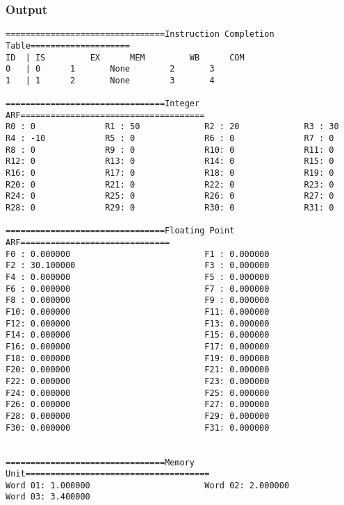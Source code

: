 \documentclass[12pt]{article}
\begin{document}
\subsubsection*{Output}
\begin{verbatim}
================================Instruction Completion Table====================
ID	| IS		 EX		 MEM		 WB		 COM
0	| 0		 1		 None		 2		 3
1	| 1		 2		 None		 3		 4

================================Integer ARF=====================================
R0 : 0              R1 : 50             R2 : 20             R3 : 30             
R4 : -10            R5 : 0              R6 : 0              R7 : 0              
R8 : 0              R9 : 0              R10: 0              R11: 0              
R12: 0              R13: 0              R14: 0              R15: 0              
R16: 0              R17: 0              R18: 0              R19: 0              
R20: 0              R21: 0              R22: 0              R23: 0              
R24: 0              R25: 0              R26: 0              R27: 0              
R28: 0              R29: 0              R30: 0              R31: 0              

================================Floating Point ARF==============================
F0 : 0.000000                           F1 : 0.000000                           
F2 : 30.100000                          F3 : 0.000000                           
F4 : 0.000000                           F5 : 0.000000                           
F6 : 0.000000                           F7 : 0.000000                           
F8 : 0.000000                           F9 : 0.000000                           
F10: 0.000000                           F11: 0.000000                           
F12: 0.000000                           F13: 0.000000                           
F14: 0.000000                           F15: 0.000000                           
F16: 0.000000                           F17: 0.000000                           
F18: 0.000000                           F19: 0.000000                           
F20: 0.000000                           F21: 0.000000                           
F22: 0.000000                           F23: 0.000000                           
F24: 0.000000                           F25: 0.000000                           
F26: 0.000000                           F27: 0.000000                           
F28: 0.000000                           F29: 0.000000                           
F30: 0.000000                           F31: 0.000000                           


================================Memory Unit=====================================
Word 01: 1.000000                       Word 02: 2.000000                       
Word 03: 3.400000
\end{verbatim}
\end{document}

